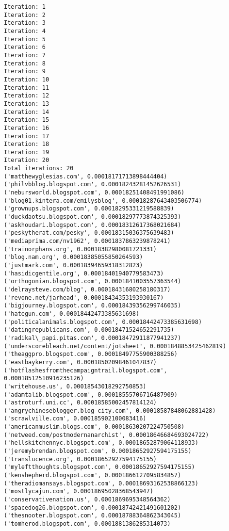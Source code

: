 \documentclass[11pt]{article}
\begin{document}
    \begin{Verbatim}[commandchars=\\\{\}]
Iteration: 1
Iteration: 2
Iteration: 3
Iteration: 4
Iteration: 5
Iteration: 6
Iteration: 7
Iteration: 8
Iteration: 9
Iteration: 10
Iteration: 11
Iteration: 12
Iteration: 13
Iteration: 14
Iteration: 15
Iteration: 16
Iteration: 17
Iteration: 18
Iteration: 19
Iteration: 20
Total iterations: 20
('matthewyglesias.com', 0.00018171713898444404)
('philvbblog.blogspot.com', 0.00018243281452626531)
('nebursworld.blogspot.com', 0.00018251408491991086)
('blog01.kintera.com/emilysblog', 0.00018287643403506774)
('grownups.blogspot.com', 0.00018295331219588839)
('duckdaotsu.blogspot.com', 0.00018297773874325393)
('askhoudari.blogspot.com', 0.00018312617368021684)
('peskytherat.com/pesky', 0.00018315036375639483)
('mediaprima.com/nv1962', 0.0001837863239878241)
('trainorphans.org', 0.00018382980081721331)
('blog.nam.org', 0.00018385055850264593)
('justmark.com', 0.00018394659318312823)
('hasidicgentile.org', 0.00018401940779583473)
('orthogonian.blogspot.com', 0.0001841003557363544)
('delraysteve.com/blog', 0.00018431680258180317)
('revone.net/jarhead', 0.00018434353193930167)
('bigjourney.blogspot.com', 0.00018439356299746035)
('hategun.com', 0.00018442473385631698)
('politicalanimals.blogspot.com', 0.00018442473385631698)
('datingrepublicans.com', 0.00018471524652291735)
('radikal\_papi.pitas.com', 0.00018472911877941237)
('underscorebleach.net/content/jotsheet', 0.0001848853425462819)
('theaggpro.blogspot.com', 0.00018497755900388256)
('eastbaykerry.com', 0.00018502098461047837)
('hotflashesfromthecampaigntrail.blogspot.com', 0.00018512510916235126)
('writehouse.us', 0.00018543018292750853)
('adamtalib.blogspot.com', 0.00018555706716487909)
('astroturf.uni.cc', 0.00018585002457814124)
('angrychineseblogger.blog-city.com', 0.00018587848062881428)
('scrawlville.com', 0.000185902100083416)
('americanmuslim.blogs.com', 0.00018630207224750508)
('netweed.com/postmodernanarchist', 0.00018646684693024722)
('hellskitchennyc.blogspot.com', 0.00018652879064118933)
('jeremybrendan.blogspot.com', 0.00018652927594175155)
('translucence.org', 0.00018652927594175155)
('myleftthoughts.blogspot.com', 0.00018652927594175155)
('kenshepherd.blogspot.com', 0.0001866127095834857)
('theradiomansays.blogspot.com', 0.00018693162538866123)
('mostlycajun.com', 0.00018695028368543947)
('conservativenation.us', 0.0001869695348564362)
('spacedog26.blogspot.com', 0.00018742421491601202)
('thesnooter.blogspot.com', 0.00018788364862343045)
('tomherod.blogspot.com', 0.0001881386285314073)

\end{Verbatim}
\end{document}
